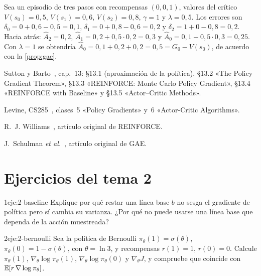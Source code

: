 \begin{ejemplo}\label{ej:gae}
Sea un episodio de tres pasos con recompensas $(0,0,1)$, valores del crítico $V(s_0)=0{,}5$, $V(s_1)=0{,}6$, $V(s_2)=0{,}8$, $\gamma=1$ y $\lambda=0{,}5$. Los errores son $\delta_0=0+0{,}6-0{,}5=0{,}1$, $\delta_1=0+0{,}8-0{,}6=0{,}2$ y $\delta_2=1+0-0{,}8=0{,}2$. Hacia atrás: $\widehat A_2=0{,}2$, $\widehat A_1=0{,}2+0{,}5\cdot 0{,}2=0{,}3$ y $\widehat A_0=0{,}1+0{,}5\cdot 0{,}3=0{,}25$. Con $\lambda=1$ se obtendría $\widehat A_0=0{,}1+0{,}2+0{,}2=0{,}5=G_0-V(s_0)$, de acuerdo con la \cref{prop:gae}.
\end{ejemplo}

\begin{lecturas}
\item Sutton y Barto~\cite{sb}, cap.~13: §13.1 (aproximación de la política), §13.2 «The Policy Gradient Theorem», §13.3 «REINFORCE: Monte Carlo Policy Gradient», §13.4 «REINFORCE with Baseline» y §13.5 «Actor--Critic Methods».
\item Levine, CS285~\cite{cs285}, clases~5 «Policy Gradients» y~6 «Actor-Critic Algorithms».
\item R.~J. Williams~\cite{williams}, artículo original de REINFORCE.
\item J.~Schulman \emph{et al.}~\cite{gae}, artículo original de GAE.
\end{lecturas}

\section*{Ejercicios del tema 2}

\begin{ejercicio}{1}{eje:2-baseline}
Explique por qué restar una línea base $b$ no sesga el gradiente de política pero sí cambia su varianza. ¿Por qué no puede usarse una línea base que dependa de la acción muestreada?
\end{ejercicio}

\begin{ejercicio}{2}{eje:2-bernoulli}
Sea la política de Bernoulli $\pi_\theta(1)=\sigma(\theta)$, $\pi_\theta(0)=1-\sigma(\theta)$, con $\theta=\ln 3$, y recompensas $r(1)=1$, $r(0)=0$. Calcule $\pi_\theta(1)$, $\nabla_\theta\log\pi_\theta(1)$, $\nabla_\theta\log\pi_\theta(0)$ y $\nabla_\theta J$, y compruebe que coincide con $\mathbb{E}[r\,\nabla\log\pi_\theta]$.
\end{ejercicio}

